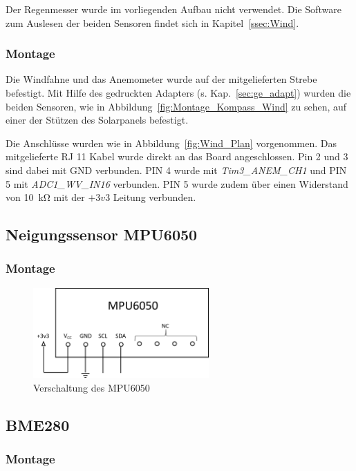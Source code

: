 Der Regenmesser wurde im vorliegenden Aufbau nicht verwendet. Die Software zum Auslesen der beiden Sensoren findet sich in Kapitel~\ref{ssec:Wind}.

\subsubsection{Montage}
Die Windfahne und das Anemometer wurde auf der mitgelieferten Strebe befestigt. Mit Hilfe des gedruckten Adapters (s. Kap.~\ref{sec:ge_adapt}) wurden die beiden Sensoren, wie in Abbildung~\ref{fig:Montage_Kompass_Wind} zu sehen, auf einer der Stützen des Solarpanels befestigt.

Die Anschlüsse wurden wie in Abbildung~\ref{fig:Wind_Plan} vorgenommen. Das mitgelieferte RJ 11 Kabel wurde direkt an das Board angeschlossen. Pin 2 und 3 sind dabei mit GND verbunden. PIN 4 wurde mit \textit{Tim3\_ANEM\_CH1} und PIN 5 mit \textit{ADC1\_WV\_IN16} verbunden. PIN 5 wurde zudem über einen Widerstand von \SI{10}{\kilo\ohm} mit der $+3v3$ Leitung verbunden.

\subsection{Neigungssensor MPU6050}

\subsubsection{Montage}
\begin{figure}[H]
  \centering
  \includegraphics[width=0.6\textwidth]{./img/MPU6050_Plan.png}
  \caption{Verschaltung des MPU6050}\label{fig:MPU6050_Plan}
\end{figure}

\subsection{BME280}

\subsubsection{Montage}

